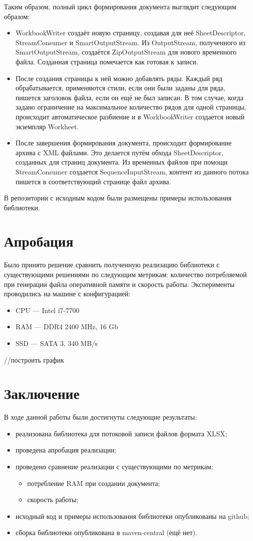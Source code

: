 \documentclass[14pt]{matmex-diploma}
\begin{document}
Таким образом, полный цикл формирования документа выглядит следующим образом: 
\begin{itemize}
    \item WorkbookWriter создаёт новую страницу, создавая для неё SheetDescriptor, StreamConsumer и SmartOutputStream. Из OutputStream, полученного из SmartOutputStream, создаётся ZipOutputStream для нового временного файла. Созданная страница помечается как готовая к записи.
    \item После создания страницы к ней можно добавлять ряды. Каждый ряд обрабатывается, применяются стили, если они были заданы для ряда, пишется заголовок файла, если он ещё не был записан. В том случае, когда задано ограничение на максимальное количество рядов для одной страницы, происходит автоматическое разбиение и в WorkbookWriter создается новый экземпляр Workheet.
    \item После завершения формирования документа, происходит формирование архива с XML файлами. Это делается путём обхода SheetDescriptor, созданных для страниц документа. Из временных файлов при помощи StreamConsumer создается SequenceInputStream, контент из данного потока пишется в соответствующий странице файл архива. 
\end{itemize}
В репозитории с исходным кодом были размещены примеры использования библиотеки.
\section{Апробация}
Было принято решение сравнить полученную реализацию библиотеки с существующими решениями по следующим метрикам: количество потребляемой при генерации файла оперативной памяти и скорость работы.
Эксперименты проводились на машине с конфигурацией: 
\begin{itemize}
    \item CPU --- Intel i7-7700
    \item RAM --- DDR4 2400 MHz, 16 Gb
    \item SSD --- SATA 3, 340 MB/s
\end{itemize}
//построить график

\section*{Заключение}
В ходе данной работы были достигнуты следующие результаты:
\begin{itemize}
    \item реализована библиотека для потоковой записи файлов формата XLSX;
    \item проведена апробация реализации;
    \item проведено сравнение реализации с существующими по метрикам:
    \begin{itemize}
        \item потребление RAM при создании документа;
        \item скорость работы;
    \end{itemize}
    \item исходный код и примеры использования библиотеки опубликованы на github;
    \item сборка библиотеки опубликована в maven-central (ещё нет).
\end{itemize}
\end{document}
